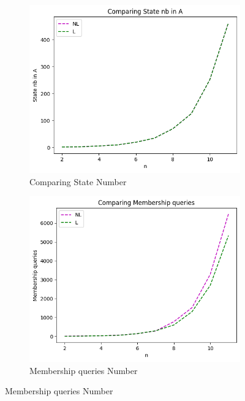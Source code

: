 \begin{figure}[!htb]
  \centering
  \begin{subfigure}[b]{0.25\textwidth}
    \includegraphics[width=\textwidth]{../statistics/plots/wrostRFSA/State nb in A.png}
    \caption{Comparing State Number}
    \label{fig:StateWrostRFSACompare}
  \end{subfigure}
  \begin{subfigure}[b]{0.25\textwidth}
    \includegraphics[width=\textwidth]{../statistics/plots/wrostRFSA/Membership queries.png}
    \caption{Membership queries Number}
    \label{fig:MemberWrostRFSACompare}
  \end{subfigure}

\end{figure}
